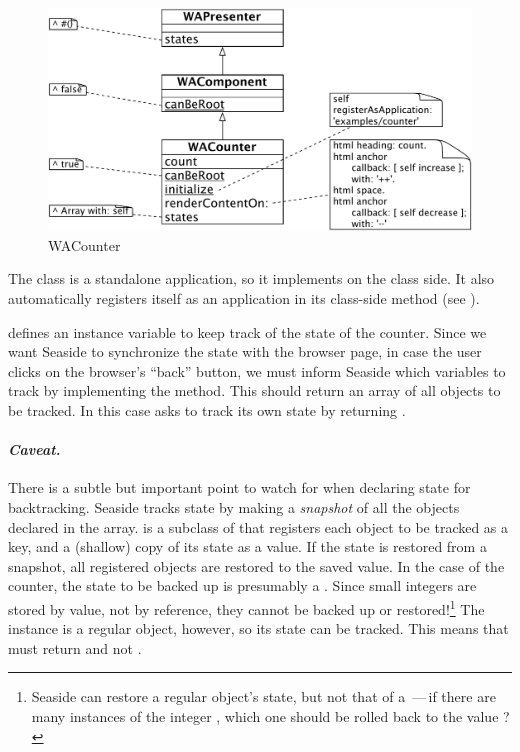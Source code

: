 \documentclass[a4paper,10pt,twoside]{book}
\begin{document}
\begin{figure}[ht]
\begin{center}
\includegraphics[width=\textwidth]{WACounter}
\caption{WACounter}
\label{fig:WACounter}
\end{center}
\end{figure}

The class  is a standalone application, so it implements  on the class side.
It also automatically registers itself as an application in its class-side  method (see ).

 defines an instance variable  to keep track of the state of the counter.
Since we want Seaside to synchronize the state with the browser page, \ie in case the user clicks on the browser's ``back'' button, we must inform Seaside which variables to track by implementing the  method.
This should return an array of all objects to be tracked.
In this case  asks to track its own state by returning .

\paragraph{\emph{Caveat.}}
There is a subtle but important point to watch for when declaring state for backtracking.
Seaside tracks state by making a \emph{snapshot} of all the objects declared in the  array.
 is a subclass of  that registers each object to be tracked as a key, and a (shallow) copy of its state as a value.
If the state is restored from a snapshot, all registered objects are restored to the saved value.
In the case of the counter, the state to be backed up is presumably a .
Since small integers are stored by value, not by reference, they cannot be backed up or restored!\footnote{Seaside can restore a regular object's state, but not that of a \,---\,if there are many instances of the integer , which one should be rolled back to the value ?}
The  instance is a regular object, however, so its state can be tracked.
This means that  must return  and not .
\end{document}
